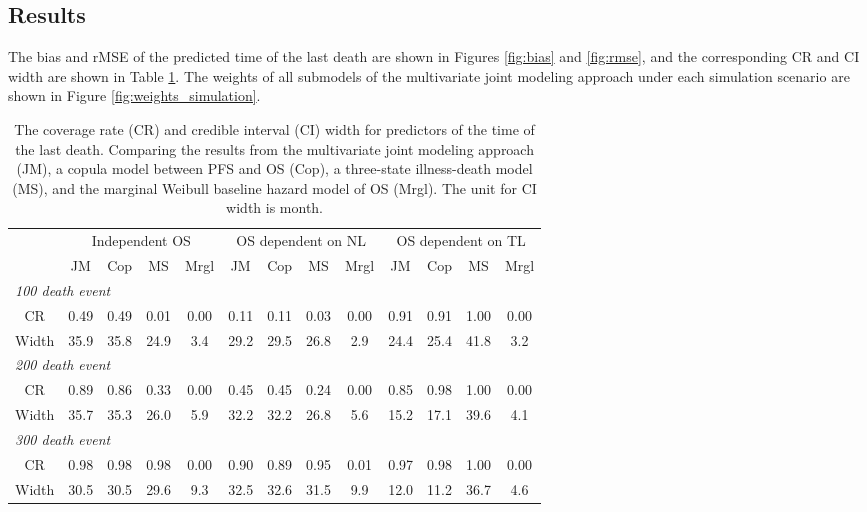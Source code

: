 \subsection{Results}

The bias and \ac{rMSE} of the predicted time of the last death are shown in Figures \ref{fig:bias} and \ref{fig:rmse}, and the corresponding \ac{CR} and \ac{CI} width are shown in Table \ref{tab:sim_result}. The weights of all submodels of the multivariate joint modeling approach under each simulation scenario are shown in Figure \ref{fig:weights_simulation}.

\begin{table}
\caption{The coverage rate (CR) and credible interval (CI) width for predictors of the time of the last death. Comparing the results from the multivariate joint modeling approach (JM), a copula model between PFS and OS (Cop), a three-state illness-death model (MS), and the marginal Weibull baseline hazard model of OS (Mrgl). The unit for CI width is month.  \label{tab:sim_result}}
\begin{center}
\begin{tabular}{ccccccccccccc}
& \multicolumn{4}{c}{Independent OS} & \multicolumn{4}{c}{OS dependent on NL} & \multicolumn{4}{c}{OS dependent on TL} \\ 
& JM & Cop & MS & Mrgl & JM & Cop & MS & Mrgl & JM & Cop & MS & Mrgl \\ \hline
\multicolumn{10}{l}{\textit{100 death event}}\\
CR & 0.49 & 0.49 & 0.01 & 0.00 & 0.11 & 0.11 & 0.03 & 0.00 &  0.91 & 0.91 & 1.00 & 0.00 \\ 
Width & 35.9 & 35.8 & 24.9 & 3.4  & 29.2 & 29.5 & 26.8 & 2.9  &  24.4 & 25.4 & 41.8 & 3.2 \\ \hline
\multicolumn{10}{l}{\textit{200 death event}}\\
CR & 0.89 & 0.86 & 0.33 & 0.00 & 0.45 & 0.45 & 0.24 & 0.00 & 0.85 & 0.98 & 1.00 & 0.00 \\ 
Width & 35.7 & 35.3 & 26.0 & 5.9 & 32.2 & 32.2 & 26.8 & 5.6 & 15.2 & 17.1 & 39.6 & 4.1  \\ \hline
\multicolumn{10}{l}{\textit{300 death event}}\\
CR & 0.98 & 0.98 & 0.98 & 0.00 & 0.90 & 0.89 &  0.95 & 0.01  & 0.97 & 0.98 & 1.00 & 0.00 \\ 
Width & 30.5 & 30.5 & 29.6 & 9.3 & 32.5 & 32.6 & 31.5 & 9.9 & 12.0 & 11.2 & 36.7 & 4.6 \\ 
\hline
\end{tabular}
\end{center}
\end{table}


